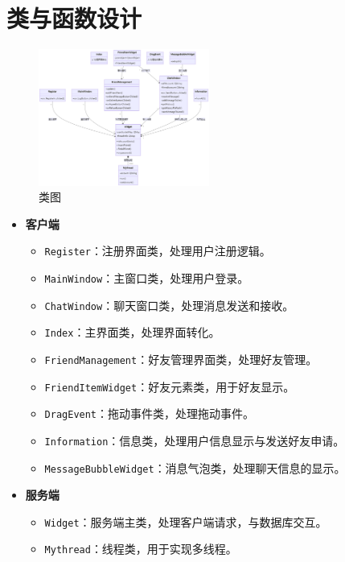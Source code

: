 \documentclass[UTF8]{ctexart}
\begin{document}
\section{类与函数设计}
\begin{figure}
	\centering
	\includegraphics[width=0.5\textwidth]{class}
	\caption{类图}
\end{figure}
\begin{itemize}
	\item \textbf{客户端}
	\begin{itemize}
		\item \texttt{Register}：注册界面类，处理用户注册逻辑。
		\item \texttt{MainWindow}：主窗口类，处理用户登录。
		\item \texttt{ChatWindow}：聊天窗口类，处理消息发送和接收。
		\item \texttt{Index}：主界面类，处理界面转化。
		\item \texttt{FriendManagement}：好友管理界面类，处理好友管理。
		\item \texttt{FriendItemWidget}：好友元素类，用于好友显示。
		\item \texttt{DragEvent}：拖动事件类，处理拖动事件。
		\item \texttt{Information}：信息类，处理用户信息显示与发送好友申请。
		\item \texttt{MessageBubbleWidget}：消息气泡类，处理聊天信息的显示。
	\end{itemize}
	\item \textbf{服务端}
	\begin{itemize}
		\item \texttt{Widget}：服务端主类，处理客户端请求，与数据库交互。
		\item \texttt{Mythread}：线程类，用于实现多线程。
	\end{itemize}
\end{itemize}
\end{document}
